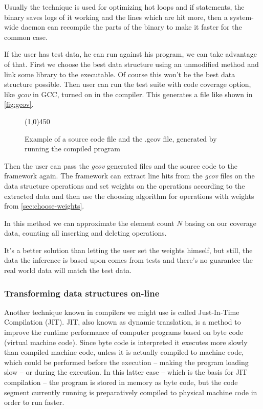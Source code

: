 \documentclass[a4paper,11pt]{article}
\begin{document}
            Usually the technique is used for optimizing hot loops and if statements, the binary saves logs of it
            working and the lines which are hit more, then a system-wide daemon can recompile the parts of the binary to
            make it faster for the common case.

			If the user has test data, he can run against his program, we can take advantage of that.  First
			we choose the best data structure using an unmodified method and link some library to the
			executable. Of course this won't be the best data structure possible. Then user can run the test
			suite with code coverage option, like \emph{gcov} in GCC, turned on in the compiler. This
			generates a file like shown in \autoref{fig:gcov}.

			\begin{figure} \label{fig:gcov}
				

				\centering \line(1,0){450}

				

				\caption{Example of a source code file and the .gcov file, generated by running the
				compiled program}

				\label{fig:gcov}
			\end{figure}


			Then the user can pass the \emph{gcov} generated files and the source code to the framework
			again. The framework can extract line hits from the \emph{gcov} files on the data structure
			operations and set weights on the operations according to the extracted data and then use the
			choosing algorithm for operations with weights from \autoref{sec:choose-weights}.

            In this method we can approximate the element count $N$ basing on our coverage data, counting all inserting
            and deleting operations.

			It's a better solution than letting the user set the weights himself, but still, the data the
			inference is based upon comes from tests and there's no guarantee the real world data will
			match the test data.

		\subsubsection{Transforming data structures on-line} \label{sec:transforming-on-line}

            Another technique known in compilers we might use is called Just-In-Time Compilation (JIT). JIT, also known
            as dynamic translation, is a method to improve the runtime performance of computer programs based on byte
            code (virtual machine code). Since byte code is interpreted it executes more slowly than compiled machine
            code, unless it is actually compiled to machine code, which could be performed before the execution – making
            the program loading slow – or during the execution. In this latter case – which is the basis for JIT
            compilation – the program is stored in memory as byte code, but the code segment currently running is
            preparatively compiled to physical machine code in order to run faster.\cite{Wijit}
\end{document}
